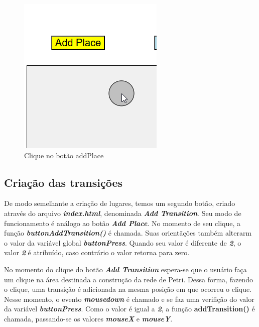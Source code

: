 \documentclass[
	12pt,				%
	openright,			%
	oneside,			%
	a4paper,			%
	english,			%
	brazil				%
	]{abntex2}
\begin{document}
\begin{figure}[ht] 
	\centering
	\includegraphics[scale=0.55]{figuras/exemplo_clique_addPlace.png}
	\caption[Clicando bo botao addPlace]{Clique no botão addPlace}
	\label{fig:clique_add_place}
\end{figure}

\subsection*{Criação das transições}

De modo semelhante a criação de lugares, temos um segundo botão, criado através do arquivo \textbf{\textit{index.html}}, denominada \textbf{\textit{Add Transition}}. Seu modo de funcionamento é análogo ao botão \textbf{\textit{Add Place}}. No momento de seu clique, a função \textbf{\textit{buttonAddTransition()}} é chamada. Suas orientãções também alterarm o valor da variável global \textbf{\textit{buttonPress}}. Quando seu valor é diferente de \textbf{\textit{2}}, o valor \textbf{\textit{2}} é atribuído, caso contrário o valor retorna para zero. 



No momento do clique do botão \textbf{\textit{Add Transition}} espera-se que o usuário faça um clique na área destinada a construção da rede de Petri. Dessa forma, fazendo o clique, uma transição é adicionada na mesma posição em que ocorreu o clique. Nesse momento, o evento \textbf{\textit{mousedown}} é chamado e se faz uma verifição do valor da variável \textbf{\textit{buttonPress}}. Como o valor é igual a \textbf{\textit{2}}, a função \textbf{addTransition()} é chamada, passando-se os valores \textbf{\textit{mouseX}} e \textbf{\textit{mouseY}}.
\end{document}
